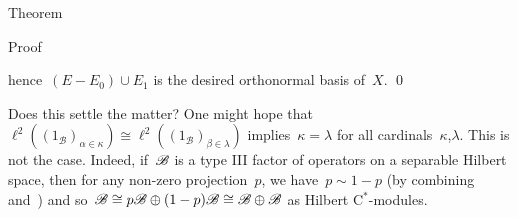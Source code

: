 \begin{parsec}
\begin{point}{Theorem}
\begin{point}{Proof}
\begin{point}
    hence~$(E - E_0) \cup E_1$ is the desired orthonormal basis of~$X$. \qed
\end{point}
\end{point}
\end{point}
\begin{point}%
Does this settle the matter?
      One might hope
    that~$\ell^2((1_{\mathscr{B}})_{\alpha \in \kappa}) \cong
        \ell^2((1_{\mathscr{B}})_{\beta\in\lambda})$
    implies~$\kappa=\lambda$ for all cardinals~$\kappa$,$\lambda$.
This is not the case.
Indeed, if~$\mathscr{B}$ is a type III factor
    of operators on a separable Hilbert space,
    then for any non-zero projection~$p$,
    we have~$p \sim 1 -p$ (by combining~\cite[Dfn.~6.5.1]{kr}
        and~\cite[Cor.~6.3.5]{kr})
    and so~$\mathscr{B} \cong p\mathscr{B} \oplus (1-p)\mathscr{B} \cong 
    \mathscr{B} \oplus \mathscr{B}$ as Hilbert C$^*$-modules.
\end{point}
\end{parsec}

